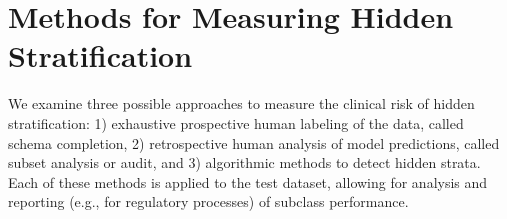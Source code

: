 \documentclass{article}
\begin{document}

\section{Methods for Measuring Hidden Stratification}
We examine three possible approaches to measure the clinical risk of hidden stratification: 1) exhaustive prospective human labeling of the data, called schema completion, 2) retrospective human analysis of model predictions, called subset analysis or audit, and 3) algorithmic methods to detect hidden strata.  
Each of these methods is applied to the test dataset, allowing for analysis and reporting (e.g., for regulatory processes) of subclass performance.
\end{document}
